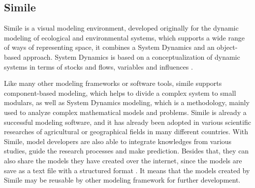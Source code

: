 \subsection{Simile}\label{sec:similie}
\par
Simile is a visual modeling environment, developed originally for the dynamic modeling of ecological and environmental systems, which supports a wide range of ways of representing space, it combines a System Dynamics and an object-based approach. System Dynamics is based on a conceptualization of dynamic systems in terms of stocks and flows, variables and influences \autocite{dsl:simile-simulistics}.
\par
Like many other modeling frameworks or software tools, simile supports component-based modeling, which helps to divide a complex system to small modulars, as well as System Dynamics modeling, which is a methodology, mainly used to analyze complex mathematical models and problems. Simile is already a successful modeling software, and it has already been adopted in various scientific researches of agricultural or geographical fields in many different countries. With Simile, model developers are also able to integrate knowledges from various studies, guide the research processes and make prediction. Besides that, they can also share the models they have created over the internet, since the models are save as a text file with a structured format \autocite{dsl:simile-muetzelfeldt}. It means that the models created by Simile may be reusable by other modeling framework for further development.
